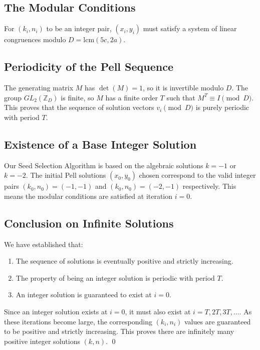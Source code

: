 \documentclass[12pt]{article}
\begin{document}
\subsection{The Modular Conditions}
For $(k_i, n_i)$ to be an integer pair, $(x_i, y_i)$ must satisfy a system of linear congruences modulo $D = \text{lcm}(5c, 2a)$.

\subsection{Periodicity of the Pell Sequence}
The generating matrix $M$ has $\det(M)=1$, so it is invertible modulo $D$. The group $GL_2(\mathbb{Z}_D)$ is finite, so $M$ has a finite order $T$ such that $M^T \equiv I \pmod{D}$. This proves that the sequence of solution vectors $v_i \pmod{D}$ is purely periodic with period $T$.

\subsection{Existence of a Base Integer Solution}
Our Seed Selection Algorithm is based on the algebraic solutions $k=-1$ or $k=-2$. The initial Pell solutions $(x_0, y_0)$ chosen correspond to the valid integer pairs $(k_0, n_0) = (-1, -1)$ and $(k_0, n_0) = (-2, -1)$ respectively. This means the modular conditions are satisfied at iteration $i=0$.

\subsection{Conclusion on Infinite Solutions}
We have established that:
\begin{enumerate}
    \item The sequence of solutions is eventually positive and strictly increasing.
    \item The property of being an integer solution is periodic with period $T$.
    \item An integer solution is guaranteed to exist at $i=0$.
\end{enumerate}
Since an integer solution exists at $i=0$, it must also exist at $i = T, 2T, 3T, \dots$. As these iterations become large, the corresponding $(k_i, n_i)$ values are guaranteed to be positive and strictly increasing. This proves there are infinitely many positive integer solutions $(k,n)$.
\qed
\end{document}
